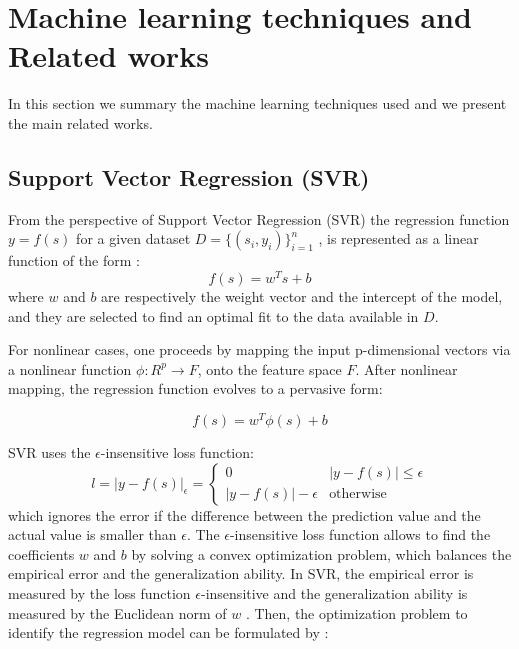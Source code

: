 \documentclass[review,authoryear,english]{elsarticle}
\begin{document}
\section{Machine learning techniques and Related works}
\label{sec:techs}

In this section we summary the machine learning techniques used and we present the main related works.

\subsection{Support Vector Regression (SVR)}

From the perspective of Support Vector Regression (SVR) the regression function $y = f(s)$ for a given dataset $D=\{(s_i,y_i)\}_{i=1}^n$ , is represented as a linear function of the form \citep{Wei2013}:
$$f(s)=w^Ts+b$$
where $w$ and $b$ are respectively the weight vector and the intercept of the model, and they are selected to find an optimal fit to the data available in $D$.

For nonlinear cases, one proceeds by mapping the input p-dimensional vectors via a nonlinear function $\phi : R^p\rightarrow F$, onto the feature space $F$.  After nonlinear mapping, the regression function evolves to a pervasive form:

$$f(s)=w^T \phi (s)+b$$

SVR uses the $\epsilon$-insensitive loss function:
\begin{equation*}
l= {\left| y - f(s) \right| }_{\epsilon } = 
\begin{cases}
   0 & {\left| y - f(s) \right| } \leq \epsilon \\
   \left| y - f(s) \right| - \epsilon & \text{otherwise}
\end{cases}
\end{equation*}
which ignores the error if the difference between the prediction value and the actual value is smaller than $\epsilon$.
%
The $\epsilon$-insensitive loss function allows to find the coefficients $w$ and $b$ by solving a convex optimization problem, which balances the empirical error and the generalization ability.
%
In SVR, the empirical error is measured by the loss function $\epsilon$-insensitive and the generalization ability is measured by the Euclidean norm of $w$ \citep{Cristiani2005}.
%
Then, the optimization problem to identify the regression model can be
formulated by \citep{Wei2013}: 
\end{document}
